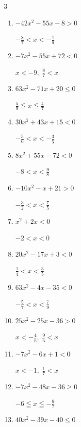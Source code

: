 \begin{multicols}{3}
\begin{enumerate}
        $\displaystyle 0 \leqq x \leqq 1$

  \item $-42x^{2}-55x-8>0$

        $\displaystyle -\frac{8}{7} < x < -\frac{1}{6}$

  \item $-7x^{2}-55x+72<0$

        $\displaystyle x < -9 , \; \frac{8}{7} < x$

  \item $63x^{2}-71x+20\leq 0$

        $\displaystyle \frac{5}{9} \leqq x \leqq \frac{4}{7}$

  \item $30x^{2}+43x+15<0$

        $\displaystyle -\frac{5}{6} < x < -\frac{3}{5}$

  \item $8x^{2}+55x-72<0$

        $\displaystyle -8 < x < \frac{9}{8}$

  \item $-10x^{2}-x+21>0$

        $\displaystyle -\frac{3}{2} < x < \frac{7}{5}$

  \item $x^{2}+2x<0$

        $\displaystyle -2 < x < 0$

  \item $20x^{2}-17x+3<0$

        $\displaystyle \frac{1}{4} < x < \frac{3}{5}$

\columnbreak %

  \item $63x^{2}-4x-35<0$

        $\displaystyle -\frac{5}{7} < x < \frac{7}{9}$

  \item $25x^{2}-25x-36>0$

        $\displaystyle x < -\frac{4}{5} , \; \frac{9}{5} < x$

  \item $-7x^{2}-6x+1<0$

        $\displaystyle x < -1 , \; \frac{1}{7} < x$

  \item $-7x^{2}-48x-36\geq 0$

        $\displaystyle -6 \leqq x \leqq -\frac{6}{7}$

  \item $40x^{2}-39x-40\leq 0$


\end{enumerate}
\end{multicols}
